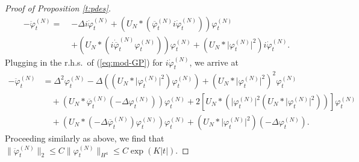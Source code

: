 \documentclass[11pt,a4paper]{article}
\newcommand{\ph}{\varphi_t^{(N)}}	%
\newcommand{\phdot}{\dot{\varphi}_t^{(N)}}	%
\newcommand{\phddot}{\ddot{\varphi}_t^{(N)}}	%
\begin{document}
\begin{proof}[Proof of Proposition \ref{t:pdes}]
\[ \begin{split}
-\phddot  = \; &-\Delta i \phdot + \left( U_N \ast (\overline{\varphi}_t^{(N)} i \phdot)\right) \ph \\
&+ \left( U_N \ast (i\dot{\overline{\varphi}}_t^{(N)} \ph) \right) \ph + \left( U_N \ast \lvert\ph\rvert^2 \right) i \phdot.
\end{split}\]
Plugging in the r.h.s.\ of (\ref{eq:mod-GP}) for $i\phdot$, we arrive at 
\begin{align*}
- \phddot & = \Delta^2 \ph - \Delta \left( (U_N \ast \lvert \ph\rvert^2)\ph \right) + \left( U_N \ast \lvert \ph\rvert^2 \right)^2 \ph \\
& \quad + (U_N \ast \overline{\varphi}_t^{(N)} (-\Delta \ph))\ph + 2 \left[ U_N \ast \left( \lvert \ph\rvert^2 (U_N \ast \lvert \ph\rvert^2) \right) \right] \ph \\
& \quad + (U_N \ast (-\Delta \overline{\varphi}_t^{(N)}) \ph ) \ph + \left( U_N \ast \lvert \ph \rvert^2 \right)(-\Delta \ph).
\end{align*}
Proceeding similarly as above, we find that $\| \ddot \varphi_t^{(N)} \|_{2} \leq C \| \varphi_t^{(N)} \|_{H^4} \leq C \exp (K |t|)$. 


\end{proof}
\end{document}
